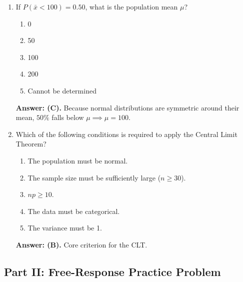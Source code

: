 \begin{enumerate}[resume, leftmargin=1.5em]
  \item If $P(\bar{x} < 100) = 0.50$, what is the population mean $\mu$?
  \begin{enumerate}[label=(\Alph*)]
    \item 0 \item 50 \item 100 \item 200 \item Cannot be determined
  \end{enumerate}
  \textbf{Answer: (C).} Because normal distributions are symmetric around their mean, $50\%$ falls below $\mu \implies \mu = 100$.

  \item Which of the following conditions is required to apply the Central Limit Theorem?
  \begin{enumerate}[label=(\Alph*)]
    \item The population must be normal.
    \item The sample size must be sufficiently large ($n \ge 30$).
    \item $np \ge 10$.
    \item The data must be categorical.
    \item The variance must be 1.
  \end{enumerate}
  \textbf{Answer: (B).} Core criterion for the CLT.
\end{enumerate}

\subsection*{Part II: Free-Response Practice Problem}

